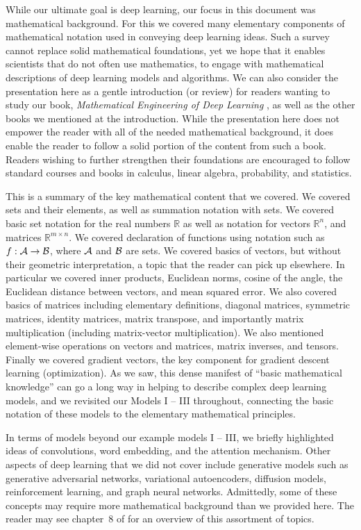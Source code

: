 While our ultimate goal is deep learning, our focus in this document was mathematical background. For this we covered many elementary components of mathematical notation used in conveying deep learning ideas. Such a survey cannot replace solid mathematical foundations, yet we hope that it enables scientists that do not often use mathematics, to engage with mathematical descriptions of deep learning models and algorithms. We can also consider the presentation here as a gentle introduction (or review) for readers wanting to study our book, {\em Mathematical Engineering of Deep Learning} \cite{LiquetMokaNazarathy2024DeepLearning}, as well as the other books we mentioned at the introduction. While the presentation here does not empower the reader with all of the needed mathematical background, it does enable the reader to follow a solid portion of the content from such a book. Readers wishing to further strengthen their foundations are encouraged to follow standard courses and books in calculus, linear algebra, probability, and statistics.\footnotemark{}


This is a summary of the key mathematical content that we covered. We covered sets and their elements, as well as summation notation with sets. We covered basic set notation for the real numbers ${\mathbb R}$ as well as notation for vectors ${\mathbb R}^n$, and matrices ${\mathbb R}^{m \times n}$. We covered declaration of functions using notation such as $f: {\cal A} \to {\cal B}$, where ${\cal A}$ and ${\cal B}$ are sets. We covered basics of vectors, but without their geometric interpretation, a topic that the reader can pick up elsewhere. In particular we covered inner products, Euclidean norms, cosine of the angle, the Euclidean distance between vectors, and mean squared error. We also covered basics of matrices including elementary definitions, diagonal matrices, symmetric matrices, identity matrices, matrix transpose, and importantly matrix multiplication (including matrix-vector multiplication). We also mentioned element-wise operations on vectors and matrices, matrix inverses, and tensors. Finally we covered gradient vectors, the key component for gradient descent learning (optimization). As we saw, this dense manifest of ``basic mathematical knowledge'' can go a long way in helping to describe complex deep learning models, and we revisited our Models I -- III throughout, connecting the basic notation of these models to the elementary mathematical principles.

In terms of models beyond our example models I -- III, we briefly highlighted ideas of convolutions, word embedding, and the attention mechanism. Other aspects of deep learning that we did not cover include generative models such as generative adversarial networks, variational autoencoders, diffusion models, reinforcement learning, and graph neural networks. Admittedly, some of these concepts may require more mathematical background than we provided here. The reader may see chapter~8 of \cite{LiquetMokaNazarathy2024DeepLearning} for an overview of this assortment of topics. 
